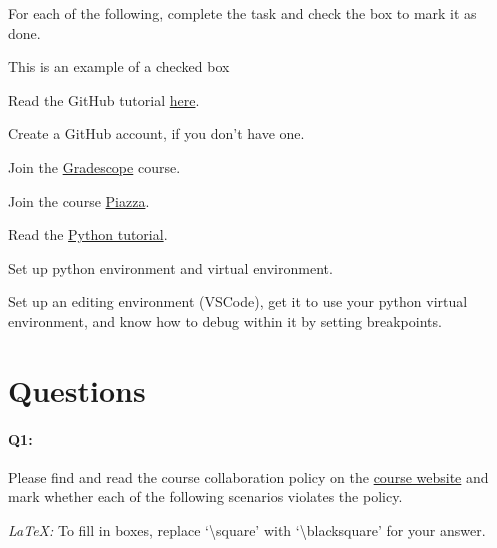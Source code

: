 \documentclass[11pt]{article}
\newcommand{\cmark}{\ding{51}}%
\newcommand{\done}{\rlap{$\square$}{\raisebox{2pt}{\large\hspace{1pt}\cmark}}%
\hspace{-2.5pt}}
\begin{document}
For each of the following, complete the task and check the box to mark it as done.
\begin{todolist}
    \item[\done] This is an example of a checked box
    \item Read the GitHub tutorial \href{https://browncsci1430.github.io/webpage/resources/github_guide/}{here}.
    \item Create a GitHub account, if you don't have one.
    \item Join the \href{https://www.gradescope.com/}{Gradescope} course.
    \item Join the course \href{https://piazza.com/}{Piazza}.
    \item Read the \href{https://browncsci1430.github.io/webpage/resources/python_tutorial/}{Python tutorial}.
    \item Set up python environment and virtual environment.
    \item Set up an editing environment (VSCode), get it to use your python virtual environment, and know how to debug within it by setting breakpoints.
\end{todolist}

\section*{Questions}

\paragraph{Q1:} Please find and read the course collaboration policy on the \href{http://cs.brown.edu/courses/csci1430/}{course website} and mark whether each of the following scenarios violates the policy.

\emph{LaTeX:} To fill in boxes, replace `\textbackslash square' with `\textbackslash blacksquare' for your answer.
\end{document}
